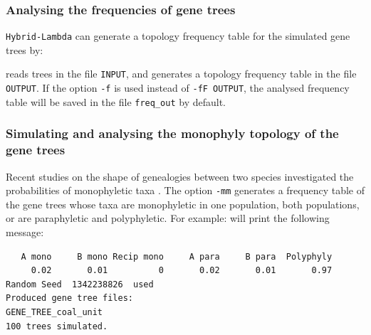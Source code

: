 \subsubsection{Analysing the frequencies of gene trees}
{\tt Hybrid-Lambda} can generate a topology frequency table for the simulated gene trees by:

reads trees in the file {\tt INPUT}, and generates a topology frequency table in the file {\tt OUTPUT}.
If the option {\tt -f} is used instead of {\tt -fF OUTPUT}, the analysed frequency table will be saved in the file {\tt freq\_out} by default.

\subsubsection{Simulating and analysing the monophyly topology of the gene trees}
Recent studies on the shape of genealogies between two species investigated the probabilities of monophyletic taxa \citep{Eldon2012,Rosenberg2003}. The option {\tt -mm} generates a frequency table of the gene trees whose taxa are monophyletic in one population, both populations, or are paraphyletic and polyphyletic.
For example:
will print the following message:
\begin{verbatim}
   A mono     B mono Recip mono     A para     B para  Polyphyly
     0.02       0.01          0       0.02       0.01       0.97
Random Seed  1342238826  used
Produced gene tree files:
GENE_TREE_coal_unit
100 trees simulated.
\end{verbatim}




